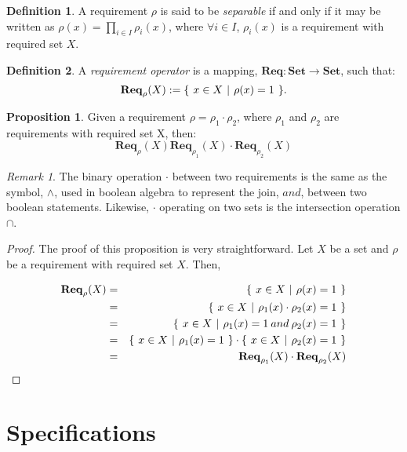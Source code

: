 \documentclass{article}
\theoremstyle{definition}
\newtheorem{definition}{Definition}[section]
\newtheorem{proposition}{Proposition}[section]
\theoremstyle{remark}
\newtheorem*{remark}{Remark}
\newcommand{\reqop}[2]{\mathbf{Req}_{#1}(#2)}
\newcommand{\setbuild}[3]
{
	\{\hspace{0.05in} 
	#1 \in #2 \hspace{0.05in} 
	| \hspace{0.05in}#3\hspace{0.05in}
	\}	
}
\begin{document}
		\begin{definition}
			A requirement $\rho$ is said to be \emph{separable} if and only if it may be written as $\rho(x) = \prod_{i \in I}{\rho_{i}(x)}$, where $\forall i \in I$, $\rho_{i}(x)$ is a requirement with required set $X$.
		\end{definition}
		
		\begin{definition}
			A \emph{requirement operator} is a mapping, $\mathbf{Req}: \mathbf{Set} \rightarrow \mathbf{Set}$, such that: \[\reqop{\rho}{X} := \setbuild{x}	{X}{\rho(x) = 1}.\]
		\end{definition}
		
		\begin{proposition}
			Given a requirement $\rho = \rho_{1}\cdot\rho_{2}$, where $\rho_{1}$ and $\rho_{2}$ are requirements with required set X, then: 
			\[
			\reqop{\rho}{X} \reqop{\rho_{1}}{X}\cdot\reqop{\rho_{2}}{X}
			\]
		\end{proposition}
		
		\begin{remark}
			The binary operation $\cdot$ between two requirements is the same as the symbol, $\wedge$, used in boolean algebra to represent the join, $and$, between two boolean statements. Likewise, $\cdot$ operating on two sets is the intersection operation $\cap$. 
		\end{remark}
		
		\begin{proof}
			The proof of this proposition is very straightforward. Let $X$ be a set and $\rho$ be a requirement with required set $X$. Then,
			
			\begin{eqnarray}
			\reqop{\rho}{X} & = & \setbuild{x}{X}{\rho(x) = 1}\\ 
			& = & \setbuild{x}{X}{\rho_{1}(x)\cdot\rho_{2}(x) = 1}\\ 
			& = & \setbuild{x}{X}{\rho_{1}(x) = 1 \mathbin{and} \rho_{2}(x) = 1}\\ 
			& = & \setbuild{x}{X}{\rho_{1}(x) = 1}\cdot\setbuild{x}{X}{\rho_{2}(x) = 1}\\
			& = & \reqop{\rho_{1}}{X}\cdot\reqop{\rho_{2}}{X}
			\end{eqnarray}
		\end{proof}
	
	\section{Specifications}
	
\end{document}
